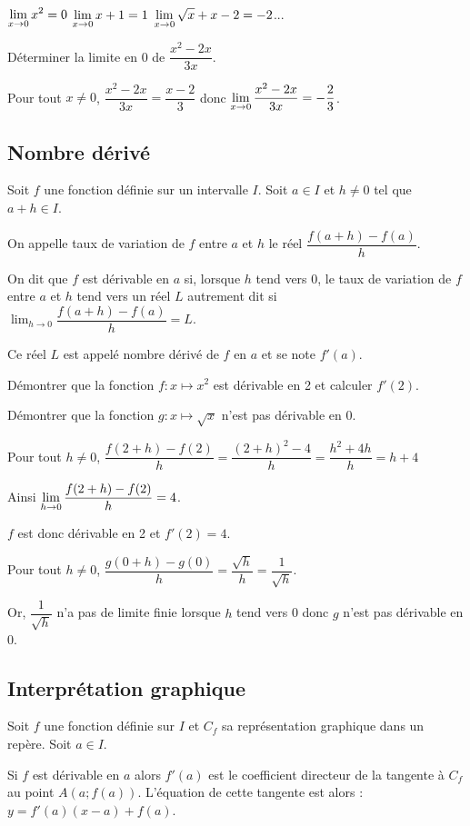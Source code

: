 \documentclass[french]{book}
\newcommand{\ds}{\displaystyle}
\newcommand{\limo}[1][x]{\ds\lim_{#1\rightarrow 0}}
\begin{document}
\begin{exemple}
$\ds \limo[x]x^{2}=0$ \hspace{1em} $\ds \limo[x]x+1=1$ \hspace{1em} $\ds \limo[x]\sqrt{x}+x-2=-2$...

Déterminer la limite en 0 de $\dfrac{x^{2}-2x}{3x}$.
\end{exemple}


Pour tout $x\neq 0$, $\dfrac{x^{2}-2x}{3x}=\dfrac{x-2}{3}$ donc $\ds \limo[x]\dfrac{x^{2}-2x}{3x}=-\dfrac{2}{3}$.

%
\subsection{Nombre dérivé}
\begin{defn}
Soit $f$ une fonction définie sur un intervalle $I$. Soit $a \in I$ et $h \neq 0$ tel que $a+h \in I$.

On appelle taux de variation de $f$ entre $a$ et $h$ le réel $\dfrac{f(a+h)-f(a)}{h}$.

On dit que $f$ est dérivable en $a$ si, lorsque $h$ tend vers 0, le taux de variation de $f$ entre $a$ et $h$ tend vers un réel $L$ autrement dit si $\ds \lim_{h\rightarrow 0}\dfrac{f(a+h)-f(a)}{h}=L$.

Ce réel $L$ est appelé nombre dérivé de $f$ en $a$ et se note $f'(a)$.
\end{defn}

\begin{exemple}
Démontrer que la fonction $f : x \longmapsto x^{2}$ est dérivable en 2 et calculer $f'(2)$.

Démontrer que la fonction $g : x \longmapsto \sqrt{x}$ n'est pas dérivable en 0.
\end{exemple}


Pour tout $h\neq 0$, $\dfrac{f(2+h)-f(2)}{h}=\dfrac{(2+h)^{2}-4}{h}=\dfrac{h^{2}+4h}{h}=h+4$

Ainsi $\ds \limo[h]\dfrac{f(2+h)-f(2)}{h}=4$.

$f$ est donc dérivable en 2 et $f'(2)=4$.

Pour tout $h\neq 0$, $\dfrac{g(0+h)-g(0)}{h}=\dfrac{\sqrt{h}}{h}=\dfrac{1}{\sqrt{h}}$.

Or, $\dfrac{1}{\sqrt{h}}$ n'a pas de limite finie lorsque $h$ tend vers 0 donc $g$ n'est pas dérivable en 0.


\subsection{Interprétation graphique}
\begin{prop}
Soit $f$ une fonction définie sur $I$ et $C_{f}$ sa représentation graphique dans un repère. Soit $a\in I$.

Si $f$ est dérivable en $a$ alors $f'(a)$ est le coefficient directeur de la tangente à $C_{f}$ au point
$A(a;f(a))$. L'équation de cette tangente est alors : $y=f'(a)(x-a)+f(a)$.
\end{prop}
\end{document}

